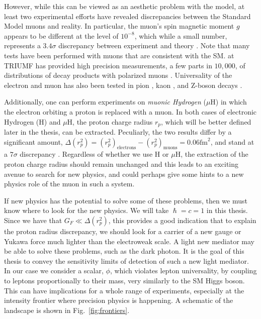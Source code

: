 However, while this can be viewed as an aesthetic problem with the model, at least two experimental efforts have revealed discrepancies between the Standard Model muons and reality.
In particular, the muon's spin magnetic moment $g$ appears to be different at the level of $10^{-8}$, which while a small number, represents a $3.4\sigma$ discrepancy between experiment and theory \cite{2007PhLB..649..173H}.
Note that many tests have been performed with muons that are consistent with the SM.
\twist at TRIUMF has provided high precision measurements, a few parts in $10,000$, of distributions of decay products with polarized muons \cite{Bayes:2011zza}.
Universality of the electron and muon has also been tested in pion \cite{Czapek:1993kc}, kaon \cite{Antonelli:2008jg}, and Z-boson decays \cite{Alexander:1991qw}.

Additionally, one can perform experiments on \emph{muonic Hydrogen} ($\mu\textrm{H}$) in which the electron orbiting a proton is replaced with a muon.
In both cases of electronic Hydrogen (H) and $\mu\textrm{H}$, the proton charge radius $r_p$, which will be better defined later in the thesis, can be extracted.
Peculiarly, the two results differ by a significant amount, $\Delta(r_p^2) = (r_p^2)_{\textrm{electrons}} - (r_p^2)_{\textrm{muons}} = 0.06\textrm{fm}^2$, and stand at a $7\sigma$ discrepancy \cite{Carlson:2015jba}.
Regardless of whether we use H or $\mu\textrm{H}$, the extraction of the proton charge radius should remain unchanged and this leads to an exciting avenue to search for new physics, and could perhaps give some hints to a new physics role of the muon in such a system.

If new physics has the potential to solve some of these problems, then we must know where to look for the new physics.
We will take $\hslash = c = 1$ in this thesis.
Since we have that $G_F \ll \Delta(r_p^2)$, this provides a good indication that to explain the proton radius discrepancy, we should look for a carrier of a new gauge or Yukawa force much lighter than the electroweak scale.
A light new mediator may be able to solve these problems, such as the dark photon.
It is the goal of this thesis to convey the sensitivity limits of detection of such a new light mediator.
In our case we consider a scalar, $\phi$, which violates lepton universality, by coupling to leptons proportionally to their mass, very similarly to the SM Higgs boson.
This can have implications for a whole range of experiments, especially at the intensity frontier where precision physics is happening.
A schematic of the landscape is shown in Fig.\ \ref{fig:frontiers}.

